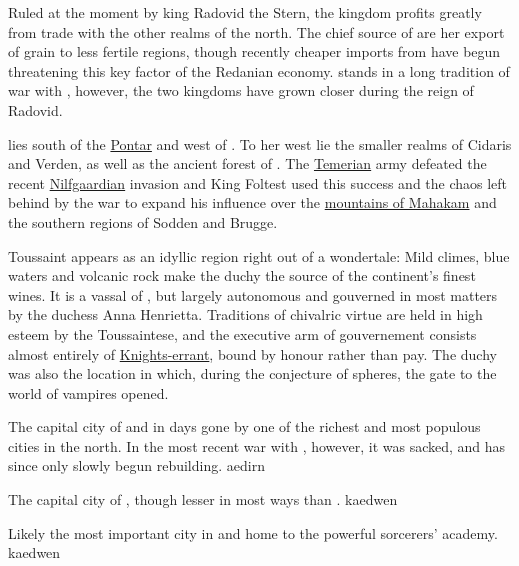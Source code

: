 {
    Ruled at the moment by king Radovid the Stern, the kingdom profits greatly from trade with the other realms of the north.
    The chief source of  are her export of grain to less fertile regions, though recently cheaper
    imports from  have begun threatening this key factor of the Redanian economy.
     stands in a long tradition of war with , however, the two kingdoms have
    grown closer during the reign of Radovid.
}

{
     lies south of the \hyperref[region:pontar]{Pontar} and west of . To her west lie the smaller realms of
    Cidaris and Verden, as well as the ancient forest of . The \hyperref[realm:temeria]{Temerian} army defeated the recent
    \hyperref[realm:nilfgaard]{Nilfgaardian} invasion and King Foltest used this success and the chaos left behind by the war
    to expand his influence over the \hyperref[region:mahakamMtns]{mountains of Mahakam} and the southern regions of Sodden and Brugge.
}

{
    Toussaint appears as an idyllic region right out of a wondertale: Mild climes, blue waters and volcanic rock make
    the duchy the source of the continent's finest wines. It is a vassal of , but largely
    autonomous and gouverned in most matters by the duchess Anna Henrietta. Traditions of chivalric virtue are held in
    high esteem by the Toussaintese, and the executive arm of gouvernement consists almost entirely of \hyperref[profession:knight_errant]{Knights-errant},
    bound by honour rather than pay. The duchy was also the location in which, during the conjecture of spheres, the
    gate to the world of vampires opened.
}

{
    The capital city of  and in days gone by one of the richest and most populous cities in the north. In the most recent war
    with , however, it was sacked, and has since only slowly begun rebuilding.
}
{aedirn}

{
    The capital city of , though lesser in most ways than .
}
{kaedwen}

{
    Likely the most important city in  and home to the powerful sorcerers' academy.
}
{kaedwen}

